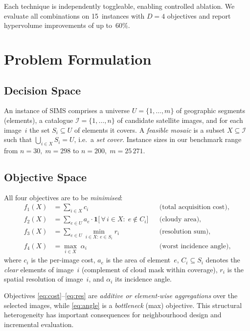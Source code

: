 \documentclass[11pt,a4paper]{article}
\newcommand{\calI}{\mathcal{I}}
\begin{document}
Each technique is independently toggleable, enabling controlled ablation.
We evaluate all combinations on 15~instances with $D{=}4$ objectives and
report hypervolume improvements of up to~$60\%$.

\section{Problem Formulation}\label{sec:problem}

\subsection{Decision Space}

An instance of SIMS comprises a universe $U = \{1,\ldots,m\}$ of
geographic segments (elements), a catalogue $\calI = \{1,\ldots,n\}$ of
candidate satellite images, and for each image~$i$ the set $S_i
\subseteq U$ of elements it covers.  A \emph{feasible mosaic} is a
subset $X \subseteq \calI$ such that $\bigcup_{i \in X} S_i = U$, i.e.\
a \emph{set cover}.  Instance sizes in our benchmark range from
$n{=}30,\; m{=}298$ to $n{=}200,\; m{=}25\,271$.

\subsection{Objective Space}

All four objectives are to be \emph{minimised}:
\begin{align}
  f_1(X) &= \sum_{i \in X} c_i
    &&\text{(total acquisition cost),} \label{eq:cost}\\
  f_2(X) &= \sum_{e \in U} a_e \cdot
    \mathbf{1}\!\bigl[\,\forall\, i \in X:\; e \notin C_i\bigr]
    &&\text{(cloudy area),} \label{eq:cloud}\\
  f_3(X) &= \sum_{e \in U}
    \min_{i \in X:\, e \in S_i} r_i
    &&\text{(resolution sum),} \label{eq:res}\\
  f_4(X) &= \max_{i \in X}\; \alpha_i
    &&\text{(worst incidence angle),} \label{eq:angle}
\end{align}
where $c_i$ is the per-image cost, $a_e$ is the area of element~$e$,
$C_i \subseteq S_i$ denotes the \emph{clear} elements of image~$i$
(complement of cloud mask within coverage), $r_i$ is the spatial
resolution of image~$i$, and $\alpha_i$ its incidence angle.

\medskip\noindent
Objectives \eqref{eq:cost}--\eqref{eq:res} are \emph{additive or
element-wise aggregations} over the selected images, while
\eqref{eq:angle} is a \emph{bottleneck} (max) objective.  This
structural heterogeneity has important consequences for neighbourhood
design and incremental evaluation.
\end{document}
